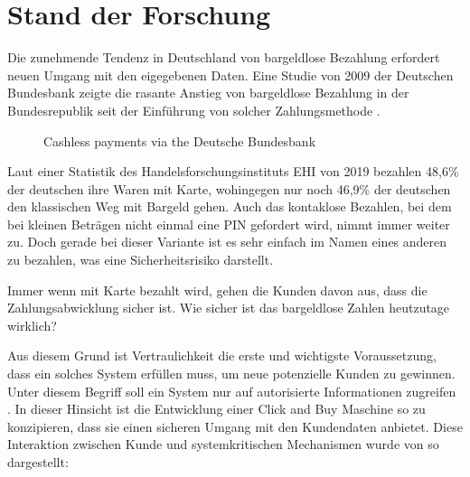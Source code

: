 \section{Stand der Forschung}


Die zunehmende Tendenz in Deutschland von bargeldlose Bezahlung erfordert neuen Umgang mit den 
eigegebenen Daten. Eine Studie von 2009 der Deutschen Bundesbank zeigte die rasante Anstieg von 
bargeldlose Bezahlung in der Bundesrepublik seit der Einführung von solcher Zahlungsmethode 
\cite{refrep:DBCP}.

\begin{figure}[htb]
    \caption{Cashless payments via the Deutsche Bundesbank}
    \label{fig:refrep_DB}
\end{figure}


Laut einer Statistik des Handelsforschungsinstituts EHI von 2019 \cite{refart:KSDL} bezahlen 48,6\% 
der deutschen ihre Waren mit Karte, wohingegen nur noch 46,9\% der deutschen den klassischen 
Weg mit Bargeld gehen. Auch das kontaklose Bezahlen, bei dem bei kleinen Beträgen nicht einmal eine
PIN gefordert wird, nimmt immer weiter zu. Doch gerade bei dieser Variante ist es sehr einfach
im Namen eines anderen zu bezahlen, was eine Sicherheitsrisiko darstellt.


Immer wenn mit Karte bezahlt wird, gehen die Kunden davon aus, dass die Zahlungsabwicklung sicher ist. 
Wie sicher ist das bargeldlose Zahlen heutzutage wirklich? 


Aus diesem Grund ist Vertraulichkeit die erste und wichtigste Voraussetzung, dass ein solches System 
erfüllen muss, um neue potenzielle Kunden zu gewinnen. Unter diesem Begriff soll ein System nur auf 
autorisierte Informationen zugreifen \cite{refbook:SWIS}. In dieser Hinsicht ist die Entwicklung 
einer Click and Buy Maschine so zu konzipieren, dass sie einen sicheren Umgang mit den Kundendaten
anbietet. Diese Interaktion zwischen Kunde und systemkritischen Mechanismen wurde von 
\cite{refart:HARE} so dargestellt:

